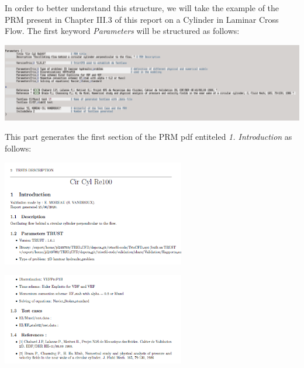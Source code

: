 In order to better understand this structure, we will take the example of the PRM present in Chapter III.3 of this report on a Cylinder in Laminar Cross Flow. The first keyword \textit{Parameters} will be structured as follows:\newline
\begin{center}\includegraphics[width=16cm]{tools/parameters_PRM_1.png}\end{center}
\begin{center}\end{center}

This part generates the first section of the PRM pdf entiteled \textit{1. Introduction} as follows:\newline
\setlength{\columnseprule}{0.5pt}
\begin{multicols}{2}
\begin{flushleft}\includegraphics[width=8cm]{tools/parameters_PRM_1_pdf.png}\end{flushleft}
\columnbreak
\vspace{0.5cm}\begin{flushright}\includegraphics[width=8cm]{tools/parameters_PRM_2_pdf.png}\end{flushright}
\end{multicols}
\begin{center}\end{center}

